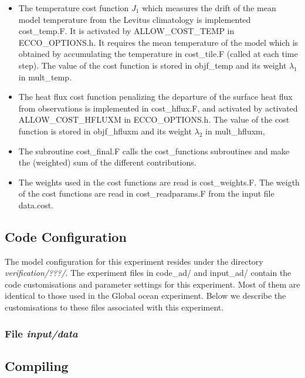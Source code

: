 \begin{itemize}

\item The temperature cost function $J_1$ which measures the drift of the mean model
temperature from the Levitus climatology is implemented cost\_temp.F. It is
activated by ALLOW\_COST\_TEMP in ECCO\_OPTIONS.h. It requires the mean temperature of
the model which is obtained by accumulating the temperature in cost\_tile.F (called at
each time step).
The value of the cost function is stored in objf\_temp and its weight $\lambda_1$
in mult\_temp.

\item The heat flux cost function penalizing the departure of the surface heat flux from
observations is implemented in cost\_hflux.F, and activated by activated
ALLOW\_COST\_HFLUXM in ECCO\_OPTIONS.h. The value of the cost function is stored in
objf\_hfluxm and its weight $\lambda_2$ in mult\_hfluxm,

\item The subroutine cost\_final.F calls the cost\_functions subroutines
and make the (weighted) sum of the different contributions.

\item The weights used in the cost functions are read is cost\_weights.F.
The weigth of the cost functions are read in cost\_readparams.F from the input file
data.cost.    

\end{itemize}


\subsection{Code Configuration}
\label{www:tutorials}
\label{SEC:eg_fourl_code_config}

The model configuration for this experiment resides under the
directory {\it verification/???/}.  The experiment files in code\_ad/
and input\_ad/ contain the code customisations and parameter settings
for this experiment. Most of them are identical to those used in
the Global ocean experiment. Below we describe the customisations to
these files associated with this experiment.

\subsubsection{File {\it input/data}}


\subsection{Compiling} 

